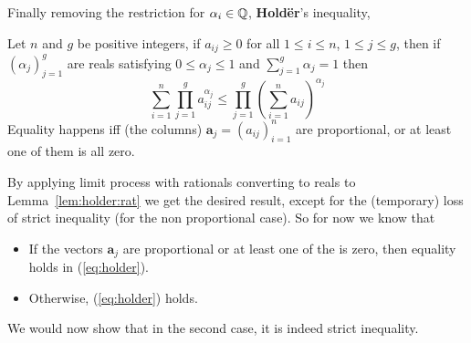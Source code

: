 Finally removing the restriction for \(\alpha_i\in\mathbb{Q}\),
\textbf{Hold\"er}'s inequality,
\begin{llem} \label{lem:holder}
Let $n$ and $g$ be positive integers,
if \(a_{ij}\geq 0\)
for all \(1\leq i \leq n\), \(1\leq j \leq g\),
then
if \((\alpha_j)_{j=1}^g\) are reals satisfying \(0\leq \alpha_j \leq 1\)
and \(\sum_{j=1}^g \alpha_j = 1\) then
\begin{equation} \label{eq:holder}
 \sum_{i=1}^n \prod_{j=1}^g a_{ij}^{\alpha_j}
 \leq
 \prod_{j=1}^g \left(\sum_{i=1}^n a_{ij}\right)^{\alpha_j}
\end{equation}
Equality happens iff (the columns)
\(\mathbf{a}_j = (a_{ij})_{i=1}^n\) are proportional, or at least
one of them is all zero.
\end{llem}
\begin{thmproof}
By applying limit process with rationals converting to reals to
Lemma~\ref{lem:holder:rat} we get the desired result, except for the
(temporary) loss of strict inequality (for the non proportional case).
So for now we know that
\begin{itemize}
 \item  If the vectors \(\mathbf{a}_j\) are proportional
        or at least one of the is zero,
        then equality holds in (\ref{eq:holder}).
 \item  Otherwise, (\ref{eq:holder}) holds.
\end{itemize}
We would now show that in the second case, it is indeed strict inequality.


\end{thmproof}
